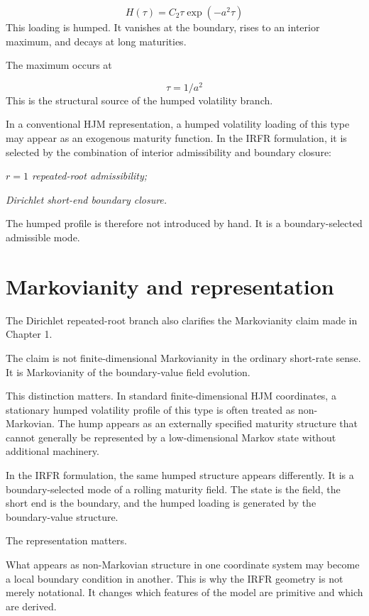 \documentclass[11pt,oneside]{book}
\begin{document}
\[
H(\tau) = C_2\tau \exp(-a^2\tau)
\]
This loading is humped. It vanishes at the boundary, rises to an
interior maximum, and decays at long maturities.

The maximum occurs at

\[
\tau=1/a^2
\]
This is the structural source of the humped volatility branch.

In a conventional HJM representation, a humped volatility loading of
this type may appear as an exogenous maturity function. In the IRFR
formulation, it is selected by the combination of interior admissibility
and boundary closure:

\begin{center}\emph{\(r=1\) repeated-root admissibility;}\end{center}
\begin{center}\emph{Dirichlet short-end boundary closure.}\end{center}
The humped profile is therefore not introduced by hand. It is a
boundary-selected admissible mode.

\section{Markovianity and representation}\label{markovianity-and-representation}

The Dirichlet repeated-root branch also clarifies the Markovianity claim
made in Chapter 1.

The claim is not finite-dimensional Markovianity in the ordinary
short-rate sense. It is Markovianity of the boundary-value field
evolution.

This distinction matters. In standard finite-dimensional HJM
coordinates, a stationary humped volatility profile of this type is
often treated as non-Markovian. The hump appears as an externally
specified maturity structure that cannot generally be represented by a
low-dimensional Markov state without additional machinery.

In the IRFR formulation, the same humped structure appears differently.
It is a boundary-selected mode of a rolling maturity field. The state is
the field, the short end is the boundary, and the humped loading is
generated by the boundary-value structure.

The representation matters.

What appears as non-Markovian structure in one coordinate system may
become a local boundary condition in another. This is why the IRFR
geometry is not merely notational. It changes which features of the
model are primitive and which are derived.
\end{document}
